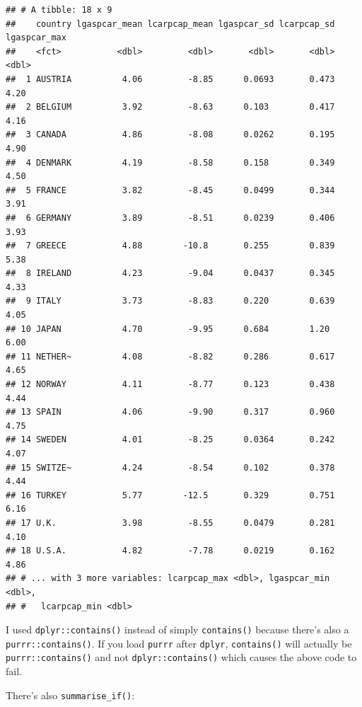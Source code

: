 \documentclass[]{gitbook}
\newenvironment{Shaded}{\begin{snugshade}}{\end{snugshade}}
\newcommand{\KeywordTok}[1]{\textcolor[rgb]{0.13,0.29,0.53}{\textbf{#1}}}
\newcommand{\NormalTok}[1]{#1}
\newcommand{\OperatorTok}[1]{\textcolor[rgb]{0.81,0.36,0.00}{\textbf{#1}}}
\newcommand{\StringTok}[1]{\textcolor[rgb]{0.31,0.60,0.02}{#1}}
\theoremstyle{definition}
\theoremstyle{definition}
\theoremstyle{definition}
\theoremstyle{remark}
\begin{document}
\begin{verbatim}
## # A tibble: 18 x 9
##    country lgaspcar_mean lcarpcap_mean lgaspcar_sd lcarpcap_sd lgaspcar_max
##    <fct>           <dbl>         <dbl>       <dbl>       <dbl>        <dbl>
##  1 AUSTRIA          4.06         -8.85      0.0693       0.473         4.20
##  2 BELGIUM          3.92         -8.63      0.103        0.417         4.16
##  3 CANADA           4.86         -8.08      0.0262       0.195         4.90
##  4 DENMARK          4.19         -8.58      0.158        0.349         4.50
##  5 FRANCE           3.82         -8.45      0.0499       0.344         3.91
##  6 GERMANY          3.89         -8.51      0.0239       0.406         3.93
##  7 GREECE           4.88        -10.8       0.255        0.839         5.38
##  8 IRELAND          4.23         -9.04      0.0437       0.345         4.33
##  9 ITALY            3.73         -8.83      0.220        0.639         4.05
## 10 JAPAN            4.70         -9.95      0.684        1.20          6.00
## 11 NETHER~          4.08         -8.82      0.286        0.617         4.65
## 12 NORWAY           4.11         -8.77      0.123        0.438         4.44
## 13 SPAIN            4.06         -9.90      0.317        0.960         4.75
## 14 SWEDEN           4.01         -8.25      0.0364       0.242         4.07
## 15 SWITZE~          4.24         -8.54      0.102        0.378         4.44
## 16 TURKEY           5.77        -12.5       0.329        0.751         6.16
## 17 U.K.             3.98         -8.55      0.0479       0.281         4.10
## 18 U.S.A.           4.82         -7.78      0.0219       0.162         4.86
## # ... with 3 more variables: lcarpcap_max <dbl>, lgaspcar_min <dbl>,
## #   lcarpcap_min <dbl>
\end{verbatim}

I used \texttt{dplyr::contains()} instead of simply \texttt{contains()}
because there's also a \texttt{purrr::contains()}. If you load
\texttt{purrr} after \texttt{dplyr}, \texttt{contains()} will actually
be \texttt{purrr::contains()} and not \texttt{dplyr::contains()} which
causes the above code to fail.

There's also \texttt{summarise\_if()}:

\begin{Shaded}
\end{Shaded}
\end{document}
